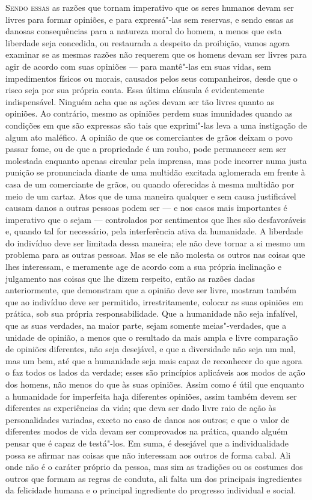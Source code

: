\textsc{Sendo essas} as razões que tornam imperativo que os seres humanos devam
ser livres para formar opiniões, e para expressá"-las sem
reservas, e sendo essas as danosas consequências para a natureza moral
do homem, a menos que esta liberdade seja concedida, ou restaurada a
despeito da proibição, vamos agora examinar se as mesmas razões não
requerem que os homens devam ser livres para agir de acordo com suas
opiniões --- para mantê"-las em suas vidas, sem impedimentos físicos ou
morais, causados pelos seus companheiros, desde que o risco seja por
sua própria conta. Essa última cláusula é evidentemente indispensável.
Ninguém acha que as ações devam ser tão livres quanto as opiniões. Ao
contrário, mesmo as opiniões perdem suas imunidades quando as condições
em que são expressas são tais que exprimi"-las leva a uma instigação
de algum ato maléfico. A opinião de que os comerciantes de grãos deixam
o povo passar fome, ou de que a propriedade é um roubo, pode permanecer
sem ser molestada enquanto apenas circular pela imprensa, mas pode
incorrer numa justa punição se pronunciada diante de uma multidão
excitada aglomerada em frente à casa de um comerciante de grãos, ou
quando oferecidas à mesma multidão por meio de um cartaz. Atos que de
uma maneira qualquer e sem causa justificável causam danos a outras
pessoas podem ser --- e nos casos mais importantes é imperativo que o
sejam --- controlados por sentimentos que lhes são desfavoráveis e, quando
tal for necessário, pela interferência ativa da humanidade. A liberdade
do indivíduo deve ser limitada dessa maneira; ele não deve tornar a si mesmo um
problema para as outras pessoas. Mas se ele não molesta os outros nas
coisas que lhes interessam, e meramente age de acordo com a sua
própria inclinação e julgamento nas coisas que lhe dizem respeito, então
as razões dadas anteriormente, que demonstram que a opinião deve ser
livre, mostram também que ao indivíduo deve ser permitido, irrestritamente, 
colocar as suas opiniões em prática, sob sua própria
responsabilidade. Que a humanidade não seja infalível, que as suas
verdades, na maior parte, sejam somente meias"-verdades, que a unidade
de opinião, a menos que o resultado da mais ampla e livre comparação
de opiniões diferentes, não seja desejável, e que a diversidade não seja
um mal, mas um bem, até que a humanidade seja mais capaz de reconhecer
do que agora o faz todos os lados da verdade; esses são princípios
aplicáveis aos modos de ação dos homens, não menos do que às suas
opiniões. Assim como é útil que enquanto a humanidade for imperfeita
haja diferentes opiniões, assim também devem ser diferentes as experiências da vida;
que deva ser dado livre raio de ação às personalidades variadas,
exceto no caso de danos aos outros; e que o valor de diferentes modos
de vida devam ser comprovados na prática, quando alguém pensar que é
capaz de testá"-los. Em suma, é desejável que a individualidade possa 
se afirmar nas coisas que não interessam aos outros de
forma cabal. Ali onde não é o caráter
próprio da pessoa, mas sim as tradições ou os costumes dos outros que
formam as regras de conduta, ali falta um dos principais ingredientes da
felicidade humana e o principal ingrediente do progresso individual e social.

